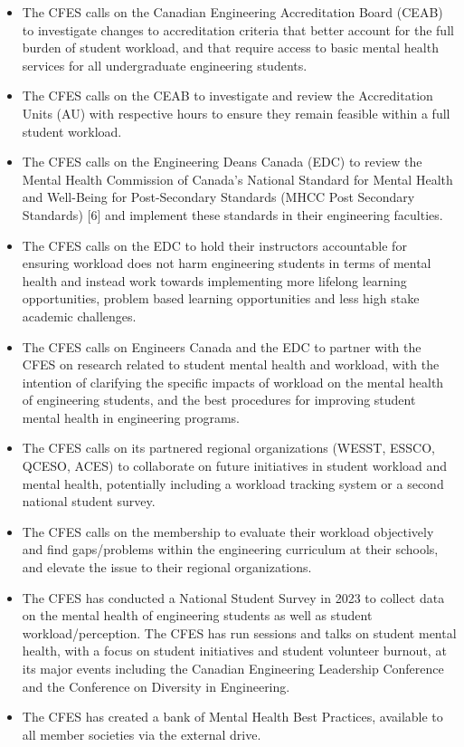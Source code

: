 \begin{itemize}
 \item The CFES calls on the Canadian Engineering Accreditation Board (CEAB) to investigate changes to accreditation criteria that better account for the full burden of student workload, and that require access to basic mental health services for all undergraduate engineering students.
 \item The CFES calls on the CEAB to investigate and review the Accreditation Units (AU) with respective hours to ensure they remain feasible within a full student workload.
 \item The CFES calls on the Engineering Deans Canada (EDC) to review the Mental Health Commission of Canada's National Standard for Mental Health and Well-Being for Post-Secondary Standards (MHCC Post Secondary Standards) [6] and implement these standards in their engineering faculties.
 \item The CFES calls on the EDC to hold their instructors accountable for ensuring workload does not harm engineering students in terms of mental health and instead work towards implementing more lifelong learning opportunities, problem based learning opportunities and less high stake academic challenges.
 \item The CFES calls on Engineers Canada and the EDC to partner with the CFES on research related to student mental health and workload, with the intention of clarifying the specific impacts of workload on the mental health of engineering students, and the best procedures for improving student mental health in engineering programs.
 \item The CFES calls on its partnered regional organizations (WESST, ESSCO, QCESO, ACES) to collaborate on future initiatives in student workload and mental health, potentially including a workload tracking system or a second national student survey.
 \item The CFES calls on the membership to evaluate their workload objectively and find gaps/problems within the engineering curriculum at their schools, and elevate the issue to their regional organizations.
\end{itemize}

\begin{itemize}
 \item The CFES has conducted a National Student Survey in 2023 to collect data on the mental health of engineering students as well as student workload/perception. The CFES has run sessions and talks on student mental health, with a focus on student initiatives and student volunteer burnout, at its major events including the Canadian Engineering Leadership Conference and the Conference on Diversity in Engineering.
 \item The CFES has created a bank of Mental Health Best Practices, available to all member societies via the external drive.
\end{itemize}

